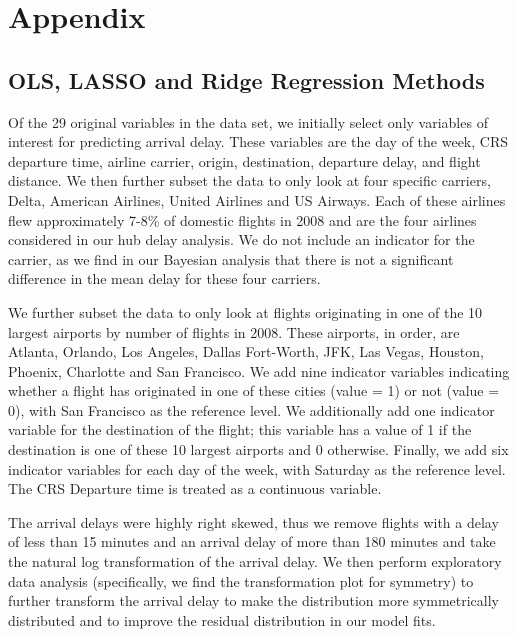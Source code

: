 \documentclass{article} %
\begin{document}
\section{Appendix}
\label{headings}


\subsection{OLS, LASSO and Ridge Regression Methods}
\label{appendix_regression}

Of the 29 original variables in the data set, we initially select only variables of interest for predicting arrival delay. These variables are the day of the week, CRS departure time, airline carrier, origin, destination, departure delay, and flight distance. We then further subset the data to only look at four specific carriers, Delta, American Airlines, United Airlines and US Airways.  Each of these airlines flew approximately 7-8\% of domestic flights in 2008 and are the four airlines considered in our hub delay analysis. We do not include an indicator for the carrier, as we find in our Bayesian analysis that there is not a significant difference in the mean delay for these four carriers.  

We further subset the data to only look at flights originating in one of the 10 largest airports by number of flights in 2008. These airports, in order, are Atlanta, Orlando, Los Angeles, Dallas Fort-Worth, JFK, Las Vegas, Houston, Phoenix, Charlotte and San Francisco. We add nine indicator variables indicating whether a flight has originated in one of these cities (value = 1) or not (value = 0), with San Francisco as the reference level. We additionally add one indicator variable for the destination of the flight; this variable has a value of 1 if the destination is one of these 10 largest airports and 0 otherwise. Finally, we add six indicator variables for each day of the week, with Saturday as the reference level.  The CRS Departure time is treated as a continuous variable.  

The arrival delays were highly right skewed, thus we remove flights with a delay of less than 15 minutes and an arrival delay of more than 180 minutes and take the natural log transformation of the arrival delay. We then perform exploratory data analysis (specifically, we find the transformation plot for symmetry) to further transform the arrival delay to make the distribution more symmetrically distributed and to improve the residual distribution in our model fits.  
 
\end{document}
